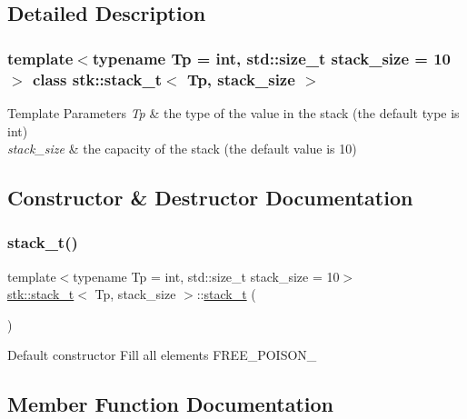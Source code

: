 \subsection{Detailed Description}
\subsubsection*{template$<$typename Tp = int, std\+::size\+\_\+t stack\+\_\+size = 10$>$\newline
class stk\+::stack\+\_\+t$<$ Tp, stack\+\_\+size $>$}


\begin{DoxyTemplParams}{Template Parameters}
{\em Tp} & the type of the value in the stack (the default type is int) \\
\hline
{\em stack\+\_\+size} & the capacity of the stack (the default value is 10) \\
\hline
\end{DoxyTemplParams}


\subsection{Constructor \& Destructor Documentation}
\mbox{\label{classstk_1_1stack__t_ab7605ffb3efbfdaf23c1411dba8076d7}} 
\subsubsection{\texorpdfstring{stack\+\_\+t()}{stack\_t()}}
{\footnotesize\ttfamily template$<$typename Tp  = int, std\+::size\+\_\+t stack\+\_\+size = 10$>$ \\
\hyperlink{classstk_1_1stack__t}{stk\+::stack\+\_\+t}$<$ Tp, stack\+\_\+size $>$\+::\hyperlink{classstk_1_1stack__t}{stack\+\_\+t} (\begin{DoxyParamCaption}{ }\end{DoxyParamCaption})\hspace{0.3cm}{\ttfamily [inline]}}

Default constructor Fill all elements F\+R\+E\+E\+\_\+\+P\+O\+I\+S\+O\+N\+\_\+ 

\subsection{Member Function Documentation}
\mbox{\label{classstk_1_1stack__t_a3dd66fcfd99c93c63cdab500bbf5a7e8}} 
